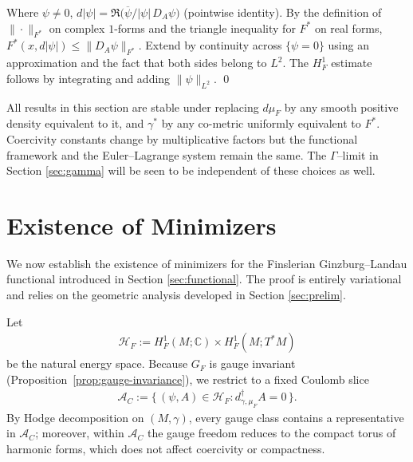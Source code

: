 \documentclass[fleqn,11pt,twoside]{article}
\makeatletter
\renewenvironment{proof}[1][\proofname]{\par
  \normalfont
  \topsep6\p@\@plus6\p@ \trivlist
  \item[\hskip\labelsep\textbf{%
    #1\@addpunct{.}}]\ignorespaces
}{%
  \qed\endtrivlist
}
\theoremstyle{definition}
\newtheorem{remark}{Remark}
\makeatother
\begin{document}
\begin{proof}
Where $\psi\neq 0$,
$d|\psi|= \Re\!\big( \overline{\psi}/|\psi|\, D_A\psi \big)$
(pointwise identity). By the definition of $\|\cdot\|_{F^*}$ on complex $1$-forms and the triangle inequality for $F^*$ on real forms, $F^*(x,d|\psi|)\le \|D_A\psi\|_{F^*}$.
Extend by continuity across $\{\psi=0\}$ using an approximation and the fact that both sides belong to $L^2$. The $H^1_F$ estimate follows by integrating and adding $\|\psi\|_{L^2}$.
\end{proof}

All results in this section are stable under replacing $d\mu_F$ by any smooth positive density equivalent to it, and $\gamma^*$ by any co-metric uniformly equivalent to $F^*$.
Coercivity constants change by multiplicative factors but the functional framework and the Euler--Lagrange system remain the same. The $\Gamma$--limit in Section \ref{sec:gamma} will
be seen to be independent of these choices as well.

\section{Existence of Minimizers}
\label{sec:existence}
We now establish the existence of minimizers for the Finslerian
Ginzburg--Landau functional introduced in Section \ref{sec:functional}. The proof is entirely variational and relies on the geometric analysis developed in Section \ref{sec:prelim}.


Let
\begin{align*}
\mathcal{H}_F := H^1_F(M;\mathbb{C}) \times H^1_F(M;T^*M)
\end{align*}
be the natural energy space. Because $G_F$ is gauge invariant
(Proposition~\ref{prop:gauge-invariance}), we restrict to a fixed Coulomb slice
\begin{align*}
\mathcal{A}_C := \{\, (\psi,A)\in \mathcal{H}_F
       : d^\dagger_{\gamma,\mu_F} A = 0 \,\}.
\end{align*}
By Hodge decomposition on $(M,\gamma)$, every gauge class
contains a representative in $\mathcal{A}_C$; moreover, within $\mathcal{A}_C$ the gauge freedom reduces to the compact torus of harmonic forms, which does not affect coercivity or compactness.
\end{document}
